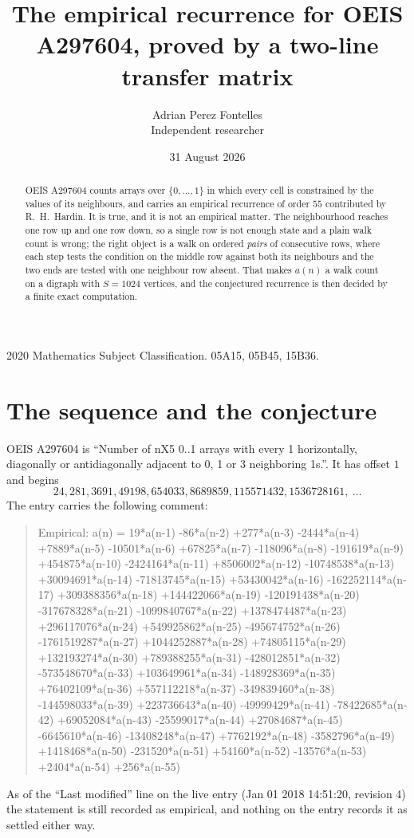 \documentclass[11pt,a4paper]{article}
\title{The empirical recurrence for OEIS A297604, proved by a two-line transfer matrix}
\author{Adrian Perez Fontelles\\ \small Independent researcher}
\date{31 August 2026}
\theoremstyle{plain}
\theoremstyle{definition}
\begin{document}
\maketitle

\begin{abstract}
OEIS A297604 counts arrays over $\{0,\dots,1\}$ in which every cell is constrained by the
values of its neighbours, and carries an empirical recurrence of order $55$ contributed
by R.~H.~Hardin. It is true, and it is not an empirical matter. The neighbourhood reaches one
row up and one row down, so a single row is not enough state and a plain walk count
is wrong; the right object is a walk on ordered \emph{pairs} of consecutive rows, where
each step tests the condition on the middle row against both its neighbours and the two
ends are tested with one neighbour row absent. That makes $a(n)$ a walk count on a digraph
with $S=1024$ vertices, and the conjectured recurrence is then decided by a finite exact
computation.
\end{abstract}

\noindent\small 2020 Mathematics Subject Classification. 05A15, 05B45, 15B36.\normalsize

\section{The sequence and the conjecture}

OEIS A297604 is ``Number of nX5 0..1 arrays with every 1 horizontally, diagonally or antidiagonally adjacent to 0, 1 or 3 neighboring 1s.''. It has offset $1$ and begins
\[
24, 281, 3691, 49198, 654033, 8689859, 115571432, 1536728161,\ \dots
\]
The entry carries the following comment:
\begin{quote}\small
Empirical: a(n) = 19*a(n-1) -86*a(n-2) +277*a(n-3) -2444*a(n-4) +7889*a(n-5) -10501*a(n-6) +67825*a(n-7) -118096*a(n-8) -191619*a(n-9) +454875*a(n-10) -2424164*a(n-11) +8506002*a(n-12) -10748538*a(n-13) +30094691*a(n-14) -71813745*a(n-15) +53430042*a(n-16) -162252114*a(n-17) +309388356*a(n-18) +144422066*a(n-19) -120191438*a(n-20) -317678328*a(n-21) -1099840767*a(n-22) +1378474487*a(n-23) +296117076*a(n-24) +549925862*a(n-25) -495674752*a(n-26) -1761519287*a(n-27) +1044252887*a(n-28) +74805115*a(n-29) +132193274*a(n-30) +789388255*a(n-31) -428012851*a(n-32) -573548670*a(n-33) +103649961*a(n-34) -148928369*a(n-35) +76402109*a(n-36) +557112218*a(n-37) -349839460*a(n-38) -144598033*a(n-39) +223736643*a(n-40) -49999429*a(n-41) -78422685*a(n-42) +69052084*a(n-43) -25599017*a(n-44) +27084687*a(n-45) -6645610*a(n-46) -13408248*a(n-47) +7762192*a(n-48) -3582796*a(n-49) +1418468*a(n-50) -231520*a(n-51) +54160*a(n-52) -13576*a(n-53) +2404*a(n-54) +256*a(n-55)
\end{quote}
As of the ``Last modified'' line on the live entry (Jan 01 2018 14:51:20, revision 4) the statement is
still recorded as empirical, and nothing on the entry records it as settled either way.
\end{document}
